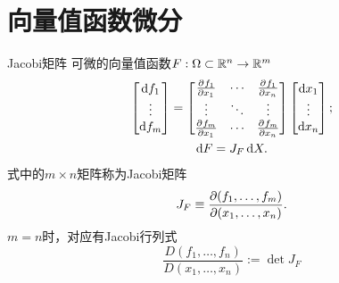 \section{向量值函数微分}
\begin{definition}[breakable=false]{Jacobi矩阵}{}
	可微的向量值函数$F:\Omega \subset \mathbb{R}^n \to \mathbb{R}^m$%
	\begin{equation}\label{eq:calc-vector-differential}
		\begin{gathered}
			\begin{bmatrix}
				\mathop{}\!\mathrm{d} f_1 \\
				\vdots     \\
				\mathop{}\!\mathrm{d} f_m
			\end{bmatrix} =
			\begin{bmatrix}
				\frac{\partial^{}f_1}{\partial{x_1}^{}} & \cdots & \frac{\partial^{}f_1}{\partial{x_n}^{}} \\
				\vdots                & \ddots & \vdots                \\
				\frac{\partial^{}f_m}{\partial{x_1}^{}} & \cdots & \frac{\partial^{}f_m}{\partial{x_n}^{}}
			\end{bmatrix}
			\begin{bmatrix}
				\mathop{}\!\mathrm{d} x_1 \\
				\vdots \\
				\mathop{}\!\mathrm{d} x_n
			\end{bmatrix};\\
			\mathop{}\!\mathrm{d} F = J_F\mathop{}\!\mathrm{d} X.
		\end{gathered}
	\end{equation}
	式中的$m \times n$矩阵称为Jacobi矩阵
	\begin{equation}\label{eq:calc-jacobian-matrix}
		J_F \equiv \frac{\partial(f_1,\ldots,f_m)}{\partial(x_1,\ldots,x_n)}.
	\end{equation}
	$m = n$时，对应有Jacobi行列式
	\begin{equation}\label{eq:calc-jacobian-determinant}
		\frac{D(f_1,\ldots,f_n)}{D(x_1,\ldots,x_n)} := \det J_F
	\end{equation}
\end{definition}
